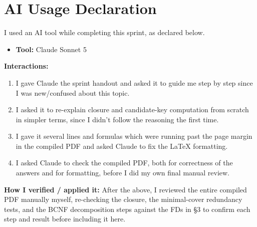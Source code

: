 \documentclass[11pt, letterpaper]{article}
\begin{document}
\section{AI Usage Declaration}

I used an AI tool while completing this sprint, as declared below.

\begin{itemize}
  \item \textbf{Tool:} Claude Sonnet 5
\end{itemize}

\textbf{Interactions:}
\begin{enumerate}
  \item I gave Claude the sprint handout and asked it to guide me step by step since I was new/confused about this topic.
  \item I asked it to re-explain closure and candidate-key computation from scratch in simpler terms, since I didn't follow the reasoning the first time.
  \item I gave it several lines and formulas which were running past the page margin in the compiled PDF and asked Claude to fix the LaTeX formatting.
  \item I asked Claude to check the compiled PDF, both for correctness of the answers and for formatting, before I did my own final manual review.
\end{enumerate}

\textbf{How I verified / applied it:} After the above, I reviewed the entire compiled PDF manually myself, re-checking the closure, the minimal-cover redundancy tests, and the BCNF decomposition steps against the FDs in \S3 to confirm each step and result before including it here.
\end{document}
